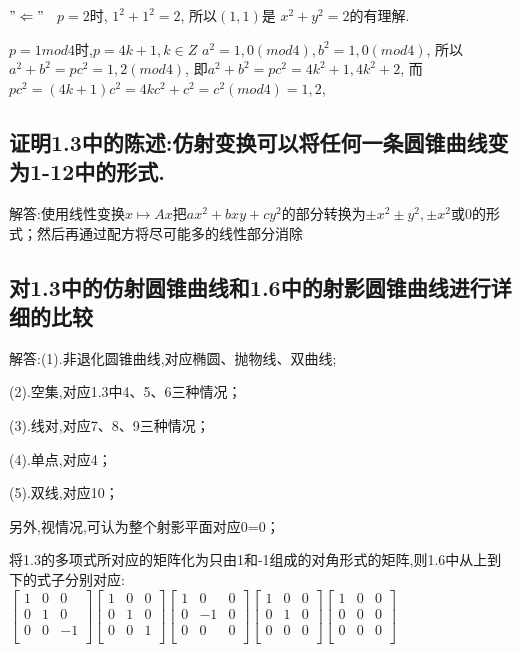 \documentclass[UTF8]{book}
\begin{document}
			$"\Leftarrow"$ \ $ p=2 $时, $1^{2}+1^{2}=2$, 所以$ (1,1) $是 $x^{2}+y^{2}=2$的有理解.
			
			$ p=1mod  4 $时,$ p=4k+1 , k \in Z$
			$a^{2}=1,0(mod 4),b^{2}=1,0(mod 4)$, 所以$a^{2}+b^{2}=pc^{2}=1,2(mod 4)$,
			即$a^{2}+b^{2}=pc^{2}=4k^{2}+1,4k^{2}+2$, 而$pc^{2}=(4k+1)c^{2}=4kc^{2}+c^{2}=c^{2}(mod 4)=1,2$,
		\subsection{证明1.3中的陈述:仿射变换可以将任何一条圆锥曲线变为1-12中的形式.}
		
		
			解答:使用线性变换$ x \mapsto Ax $把$ax^{2}+bxy+cy^{2}$的部分转换为$\pm x^{2} \pm y^{2},\pm x^{2}$或0的形式；然后再通过配方将尽可能多的线性部分消除
		\subsection{对1.3中的仿射圆锥曲线和1.6中的射影圆锥曲线进行详细的比较}
			解答:(1).非退化圆锥曲线,对应椭圆、抛物线、双曲线;
			
			
			(2).空集,对应1.3中4、5、6三种情况；
			
			
			(3).线对,对应7、8、9三种情况；
			
			
			(4).单点,对应4；
			
			
			(5).双线,对应10；
			
			
			另外,视情况,可认为整个射影平面对应0=0；
			
			
			将1.3的多项式所对应的矩阵化为只由1和-1组成的对角形式的矩阵,则1.6中从上到下的式子分别对应:
			$\begin{bmatrix}
			    1&0&0\\
			    0&1&0\\
			    0&0&-1\\
			\end{bmatrix}
			\begin{bmatrix}
			    1&0&0\\
			    0&1&0\\
			    0&0&1\\
			\end{bmatrix}
			\begin{bmatrix}
			    1&0&0\\
			    0&-1&0\\
			    0&0&0\\
			\end{bmatrix}
			\begin{bmatrix}
			    1&0&0\\
			    0&1&0\\
			    0&0&0\\
			\end{bmatrix}
			\begin{bmatrix}
			    1&0&0\\
			    0&0&0\\
			    0&0&0\\
			\end{bmatrix}$
\end{document}
